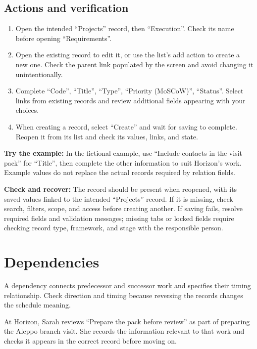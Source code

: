 \subsection{Actions and verification}
\begin{enumerate}
\item Open the intended “Projects” record, then “Execution”. Check its name before opening “Requirements”.
\item Open the existing record to edit it, or use the list's add action to create a new one. Check the parent link populated by the screen and avoid changing it unintentionally.
\item Complete “Code”, “Title”, “Type”, “Priority (MoSCoW)”, “Status”. Select links from existing records and review additional fields appearing with your choices.
\item When creating a record, select “Create” and wait for saving to complete. Reopen it from its list and check its values, links, and state.
\end{enumerate}

\textbf{Try the example:} In the fictional example, use “Include contacts in the visit pack” for “Title”, then complete the other information to suit Horizon's work. Example values do not replace the actual records required by relation fields.

\textbf{Check and recover:} The record should be present when reopened, with its saved values linked to the intended “Projects” record. If it is missing, check search, filters, scope, and access before creating another. If saving fails, resolve required fields and validation messages; missing tabs or locked fields require checking record type, framework, and stage with the responsible person.

\clearpage
\section{Dependencies}
\label{sec:projects-feature-dependencies}

A dependency connects predecessor and successor work and specifies their timing relationship. Check direction and timing because reversing the records changes the schedule meaning.

\begin{rcnote}
At Horizon, Sarah reviews “Prepare the pack before review” as part of preparing the Aleppo branch visit. She records the information relevant to that work and checks it appears in the correct record before moving on.
\end{rcnote}

